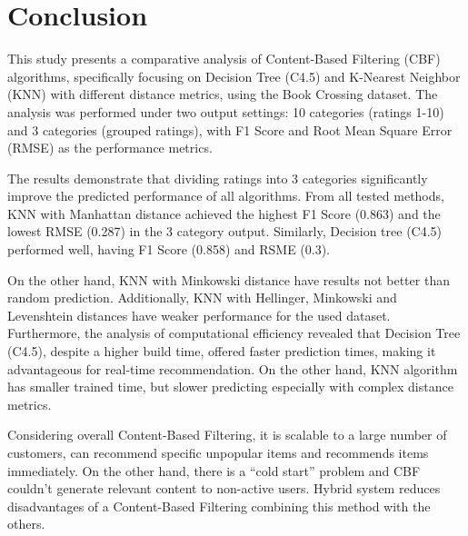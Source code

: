 \section{Conclusion}\label{sec:conclusion}
This study presents a comparative analysis of Content-Based Filtering (CBF) algorithms, specifically focusing on Decision Tree (C4.5) and K-Nearest Neighbor (KNN) with different distance metrics, using the Book Crossing dataset. The analysis was performed under two output settings: 10 categories (ratings 1-10) and 3 categories (grouped ratings), with F1 Score and Root Mean Square Error (RMSE) as the performance metrics.

The results demonstrate that dividing ratings into 3 categories significantly improve the predicted performance of all algorithms. From all tested methods, KNN with Manhattan distance achieved the highest F1 Score (0.863) and the lowest RMSE (0.287) in the 3 category output. Similarly, Decision tree (C4.5) performed well, having F1 Score (0.858) and RSME (0.3).

On the other hand, KNN with Minkowski distance have results not better than random prediction. Additionally, KNN with Hellinger, Minkowski and Levenshtein distances have weaker performance for the used dataset. Furthermore, the analysis of computational efficiency revealed that Decision Tree (C4.5), despite a higher build time, offered faster prediction times, making it advantageous for real-time recommendation. On the other hand, KNN algorithm has smaller trained time, but slower predicting especially with complex distance metrics.

Considering overall Content-Based Filtering, it is scalable to a large number of customers,  can recommend specific unpopular items and recommends items immediately. On the other hand, there is a “cold start” problem and CBF couldn't generate relevant content to non-active users. Hybrid system reduces disadvantages of a Content-Based Filtering combining this method with the others.